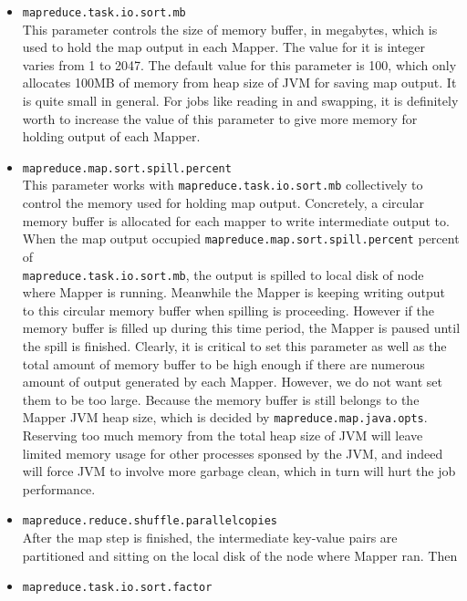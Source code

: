 \begin{itemize}

\item \texttt{mapreduce.task.io.sort.mb} \\
This parameter controls the size of memory buffer, in megabytes, which is used 
to hold the map output in each Mapper. The value for it is integer varies from 1 
to 2047. The default value for this parameter is 100, which only allocates 100MB
of memory from heap size of JVM for saving map output. It is quite small in 
general. For jobs like reading in and swapping, it is definitely worth to increase
the value of this parameter to give more memory for holding output of each Mapper.

\item \texttt{mapreduce.map.sort.spill.percent}\\
This parameter works with \texttt{mapreduce.task.io.sort.mb} collectively to 
control the memory used for holding map output. Concretely, a circular memory 
buffer is allocated for each mapper to write intermediate output to. When the 
map output occupied \texttt{mapreduce.map.sort.spill.percent} percent of \\
\texttt{mapreduce.task.io.sort.mb}, the output is spilled to local disk of node
where Mapper is running. Meanwhile the Mapper is keeping writing output to this
circular memory buffer when spilling is proceeding. However if the memory buffer
is filled up during this time period, the Mapper is paused until the spill is
finished. Clearly, it is critical to set this parameter as well as the total 
amount of memory buffer to be high enough if there are numerous amount of output
generated by each Mapper. However, we do not want set them to be too large.
Because the memory buffer is still belongs to the Mapper JVM heap size, which is
decided by \texttt{mapreduce.map.java.opts}. Reserving too much memory from the
total heap size of JVM will leave limited memory usage for other processes sponsed
by the JVM, and indeed will force JVM to involve more garbage clean, which in 
turn will hurt the job performance.    

\item \texttt{mapreduce.reduce.shuffle.parallelcopies}\\
After the map step is finished, the intermediate key-value pairs are partitioned
and sitting on the local disk of the node where Mapper ran. Then 




\item \texttt{mapreduce.task.io.sort.factor}


\end{itemize}

